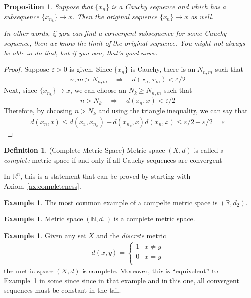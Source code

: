 \documentclass[12pt]{article}
\theoremstyle{plain}
\newtheorem{prop}[thm]{Proposition}
\theoremstyle{definition}
\newtheorem{defn}[thm]{Definition}
\newtheorem{ex}[thm]{Example}
\theoremstyle{remark}
\newcommand{\R}{\mathbb{R}}
\newcommand{\N}{\mathbb{N}}
\begin{document}
\begin{prop}
\label{prop:cauchy-subseq}
Suppose that $\{x_n\}$ is a Cauchy sequence and which has a subsequence
$\{x_{n_k}\}\rightarrow x$. Then the original sequence
$\{x_n\}\rightarrow x$ as well.

In other words, if you can find a convergent subsequence for some Cauchy
sequence, then we know the limit of the original sequence. You might not
always be able to do that, but if you can, that's good news.
\end{prop}
\begin{proof}
Suppose $\varepsilon>0$ is given.  Since $\{x_n\}$ is Cauchy, there is
an $N_{n,m}$ such that
\begin{align*}
  n,m>N_{n,m}
  \quad\Rightarrow\quad
  d(x_n,x_m) <\varepsilon/2
\end{align*}
Next, since $\{x_{n_k}\}\rightarrow x$, we can choose an $N_k \geq
N_{n,m}$ such that
\begin{align*}
  n > N_k
  \quad\Rightarrow\quad
  d(x_n, x) < \varepsilon/2
\end{align*}
Therefore, by choosing $n>N_k$ and using the triangle inequality, we can
say that
\begin{align*}
  d(x_n,x) \leq d(x_n, x_{n_k}) + d(x_{n_k},x)
  d(x_n,x) \leq \varepsilon/2 + \varepsilon/2 = \varepsilon
\end{align*}
\end{proof}

\begin{defn}{(Complete Metric Space)}
Metric space $(X,d)$ is called a \emph{complete} metric space if and
only if all Cauchy sequences are convergent.

In $\R^n$, this is a statement that can be proved by starting
with Axiom~\ref{ax:completeness}.
\end{defn}

\begin{ex}
The most common example of a compelte metric space is
$(\R,d_2)$.
\end{ex}

\begin{ex}
\label{ex:Ncomplete}
Metric space $(\N,d_1)$ is a complete metric space.
\end{ex}

\begin{ex}
Given any set $X$ and the \emph{discrete} metric
\begin{align*}
  d(x,y) =
  \begin{cases}
    1 & x\neq y \\
    0 & x= y \\
  \end{cases}
\end{align*}
the metric space $(X,d)$ is complete.
Moreover, this is ``equivalent'' to Example~\ref{ex:Ncomplete} in some
since since in that example and in this one, all convergent sequences
must be constant in the tail.
\end{ex}
\end{document}

